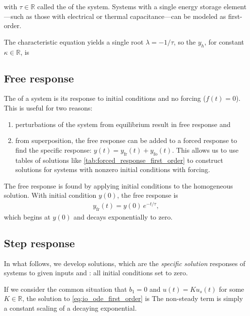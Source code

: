 \documentclass[dynamic_systems.tex]{subfiles}
\begin{document}
with $\tau\in\mathbb{R}$ called the  of the system.
Systems with a single energy storage element---such as those with electrical or thermal capacitance---can be modeled as first-order.

The characteristic equation yields a single root $\lambda = -1/\tau$, so the  $y_h$, for constant $\kappa\in\mathbb{R}$, is

\subsection{Free response}
\tags{}

The  of a system is its response to initial conditions and no forcing ($f(t) = 0$).
This is useful for two reasons:
\tags{}
\begin{enumerate}
	\item perturbations of the system from equilibrium result in free response and
	\item from superposition, the free response can be added to a forced response to find the specific response: $y(t) = y_\text{fr}(t) + y_\text{fo}(t)$. This allows us to use tables of solutions like \autoref{tab:forced_response_first_order} to construct solutions for systems with nonzero initial conditions with forcing.
\end{enumerate}

The free response is found by applying initial conditions to the homogeneous solution. 
With initial condition $y(0)$, the free response is
\tags{}
\begin{align}\label{eq:free1}
	y_\text{fr}(t) = y(0)\, e^{-t/\tau},
\end{align}
which begins at $y(0)$ and decays exponentially to zero.

\subsection{Step response}
\tags{}

In what follows, we develop  solutions, which are the \emph{specific solution} responses of systems to given inputs and : all initial conditions set to zero.
\tags{}

If we consider the common situation that $b_1 = 0$ and $u(t) = K u_s(t)$ for some $K\in\mathbb{R}$, the solution to \autoref{eq:io_ode_first_order} is
\noindent The non-steady term is simply a constant scaling of a decaying exponential.
\end{document}
